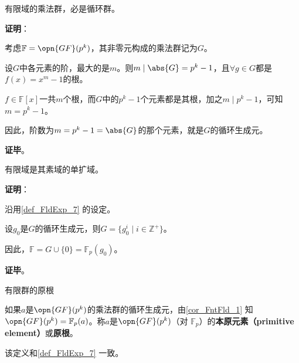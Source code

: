 \begin{theorem}{}\label{the_FntFld_1}
有限域的乘法群，必是循环群。
\end{theorem}

\textbf{证明}：

考虑$\mathbb{F}=\opn{GF}(p^k)$，其非零元构成的乘法群记为$G$。

设$G$中各元素的阶，最大的是$m$。则$m\mid \abs{G} = p^k-1$，且$\forall g\in G$都是$f(x)=x^m-1$的根。

$f\in\mathbb{F}[x]$一共$m$个根，而$G$中的$p^k-1$个元素都是其根，加之$m\mid p^k-1$，可知$m=p^k-1$。

因此，阶数为$m=p^k-1=\abs{G}$的那个元素，就是$G$的循环生成元。

\textbf{证毕}。

\begin{corollary}{}\label{cor_FntFld_1}
有限域是其素域的单扩域。
\end{corollary}

\textbf{证明}：

沿用\autoref{def_FldExp_7} 的设定。

设$g_0$是$G$的循环生成元，则$G=\{g_0^i\mid i\in\mathbb{Z}^+\}$。

因此，$\mathbb{F}=G\cup\{0\}=\mathbb{F}_p(g_0)$。

\textbf{证毕}。

\begin{definition}{有限群的原根}

如果$a$是$\opn{GF}(p^k)$的乘法群的循环生成元，由\autoref{cor_FntFld_1} 知$\opn{GF}(p^k)=\mathbb{F}_p(a)$。称$a$是$\opn{GF}(p^k)$（对 $\mathbb{F}_p$）的\textbf{本原元素（primitive element）}或\textbf{原根}。

该定义和\autoref{def_FldExp_7} 一致。

\end{definition}

